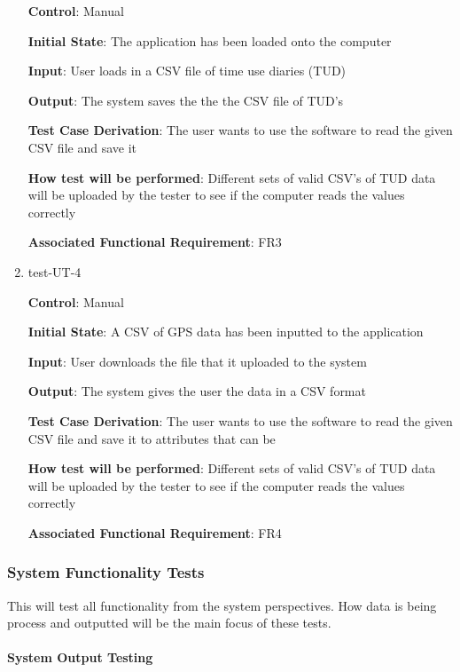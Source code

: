 \documentclass[12pt, titlepage]{article}
\begin{document}
\begin{enumerate}
\textbf{Control}: Manual 
					
\textbf{Initial State}: The application has been loaded onto the computer
					
\textbf{Input}: User loads in a CSV file of time use diaries (TUD)
					
\textbf{Output}: The system saves the the the CSV file of TUD's

\textbf{Test Case Derivation}: The user wants to use the software to read the given CSV file and save it
					
\textbf{How test will be performed}: Different sets of valid CSV's of TUD data will be uploaded by the tester to see if the computer reads the values correctly

\textbf{Associated Functional Requirement}: FR3

\item{test-UT-4\\}

\textbf{Control}: Manual 
					
\textbf{Initial State}: A CSV of GPS data has been inputted to the application
					
\textbf{Input}: User downloads the file that it uploaded to the system 
					
\textbf{Output}: The system gives the user the data in a CSV format 

\textbf{Test Case Derivation}: The user wants to use the software to read the given CSV file and save it to attributes that can be 
					
\textbf{How test will be performed}: Different sets of valid CSV's of TUD data will be uploaded by the tester to see if the computer reads the values correctly

\textbf{Associated Functional Requirement}: FR4
\end{enumerate}

\subsubsection{System Functionality Tests}

This will test all functionality from the system perspectives. How data is being process and outputted will be the main focus of these tests. 
		
\paragraph{System Output Testing}
\end{document}
